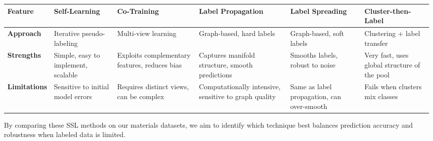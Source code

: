 \begin{table}[H]
\centering\small
\renewcommand{\arraystretch}{1.25}
\begin{tabularx}{\textwidth}{>{\bfseries}l X X X X X}
\toprule
Feature & Self-Learning & Co-Training & Label Propagation & Label Spreading & Cluster-then-Label\\
\midrule
Approach & Iterative pseudo-labeling & Multi-view learning & Graph-based, hard labels &
Graph-based, soft labels & Clustering + label transfer\\
Strengths & Simple, easy to implement, scalable & Exploits complementary features, reduces bias
& Captures manifold structure, smooth predictions & Smooths labels, robust to noise & Very fast,
uses global structure of the pool\\
Limitations & Sensitive to initial model errors & Requires distinct views, can be complex &
Computationally intensive, sensitive to graph quality & Same as label propagation, can
over-smooth & Fails when clusters mix classes\\
\bottomrule
\end{tabularx}
\end{table}

By comparing these SSL methods on our materials datasets, we aim to identify which technique
best balances prediction accuracy and robustness when labeled data is limited.
